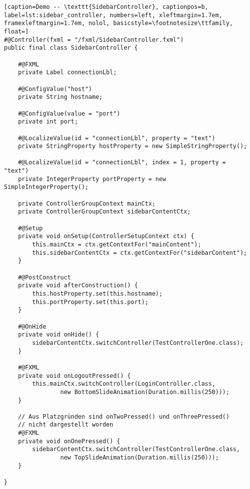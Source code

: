 	\begin{lstlisting}[caption=Demo -- \texttt{SidebarController}, captionpos=b, label=lst:sidebar_controller, numbers=left, xleftmargin=1.7em, framexleftmargin=1.7em, nolol, basicstyle=\footnotesize\ttfamily, float=]
#@Controller(fxml = "/fxml/SidebarController.fxml")
public final class SidebarController {

    #@FXML
    private Label connectionLbl;

    #@ConfigValue("host")
    private String hostname;

    #@ConfigValue(value = "port")
    private int port;

    #@LocalizeValue(id = "connectionLbl", property = "text")
    private StringProperty hostProperty = new SimpleStringProperty();

    #@LocalizeValue(id = "connectionLbl", index = 1, property = "text")
    private IntegerProperty portProperty = new SimpleIntegerProperty();

    private ControllerGroupContext mainCtx;
    private ControllerGroupContext sidebarContentCtx;

    #@Setup
    private void onSetup(ControllerSetupContext ctx) {
        this.mainCtx = ctx.getContextFor("mainContent");
        this.sidebarContentCtx = ctx.getContextFor("sidebarContent");
    }

    #@PostConstruct
    private void afterConstruction() {
        this.hostProperty.set(this.hostname);
        this.portProperty.set(this.port);
    }

    #@OnHide
    private void onHide() {
        sidebarContentCtx.switchController(TestControllerOne.class);
    }

    #@FXML
    private void onLogoutPressed() {
        this.mainCtx.switchController(LoginController.class, 
				new BottomSlideAnimation(Duration.millis(250)));
    }
	
	// Aus Platzgründen sind onTwoPressed() und onThreePressed()
	// nicht dargestellt worden
    #@FXML
    private void onOnePressed() {
        sidebarContentCtx.switchController(TestControllerOne.class, 
				new TopSlideAnimation(Duration.millis(250)));
    }

}
	\end{lstlisting}
